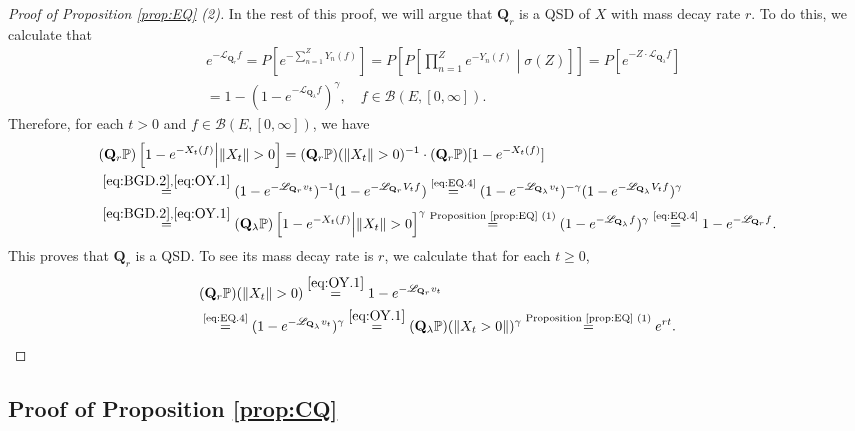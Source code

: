 \documentclass[12pt,a4paper]{amsart}
\numberwithin{equation}{section}
\theoremstyle{plain}
\theoremstyle{definition}
\theoremstyle{remark}
\begin{document}
\begin{proof}[Proof of Proposition \ref{prop:EQ} (2)]
	In the rest of this proof, we will argue that $\mathbf Q_r$ is a QSD of $X$ with mass decay rate $r$.
	To do this, we calculate that
\begin{align}
	&e^{- \mathscr L_{\mathbf Q_r} f}
	= P[ e^{-\sum_{n=1}^Z Y_n(f)} ] 	
	= P\left[P\left[ \prod_{n=1}^Z e^{-Y_n(f)} \middle | \sigma(Z)\right]\right]
	= P \left[ e^{-Z \cdot \mathscr L_{\mathbf Q_\lambda } f}\right]
	\\&= 1 - (1 - e^{- \mathscr L_{\mathbf Q_\lambda} f})^\gamma, \quad f\in \mathcal B(E,[0,\infty]).  \label{eq:EQ.4}
\end{align}
	Therefore, for each $t> 0$ and $f\in \mathcal B(E,[0,\infty])$, we have
\begin{align}
	&(\mathbf Q_r \mathbb P)\left[ 1 - e^{-X_t (f)} \middle|\|X_t\|>0 \right]
	= (\mathbf Q_r \mathbb P)(\|X_t\| >0)^{-1} \cdot (\mathbf Q_r \mathbb P) [1 - e^{- X_t(f)}]
	\\&\overset{\eqref{eq:BGD.2}, \eqref{eq:OY.1}}= (1 - e^{- \mathscr L_{\mathbf Q_r} v_t})^{-1}  (1 - e^{- \mathscr L_{\mathbf Q_r} V_tf})
	\overset{\text{\eqref{eq:EQ.4}}}= (1 - e^{- \mathscr L_{\mathbf Q_\lambda} v_t})^{-\gamma}(1 - e^{- \mathscr L_{\mathbf Q_\lambda} V_tf})^{\gamma}
	\\&\overset{\eqref{eq:BGD.2}, \eqref{eq:OY.1}}= (\mathbf Q_\lambda \mathbb P)\left[1 - e^{- X_t(f)}\middle| \|X_t\|>0\right]^{\gamma}
	\overset{\text{Proposition \ref{prop:EQ} (1)}}= (1 - e^{- \mathscr L_{\mathbf Q_\lambda} f})^{\gamma}
	\overset{\text{\eqref{eq:EQ.4}}}= 1 - e^{- \mathscr L_{\mathbf Q_r} f}.
\end{align}
	This proves that $\mathbf Q_r$ is a QSD.
	To see its mass decay rate is $r$, we calculate that for each $t\geq 0$,
\begin{align}
	&(\mathbf Q_r \mathbb P)(\|X_t\|>0)
	\overset{\eqref{eq:OY.1}}= 1 - e^{- \mathscr L_{\mathbf Q_r} v_t}
	\\& \overset{\text{\eqref{eq:EQ.4}}}= (1 - e^{- \mathscr L_{\mathbf Q_\lambda} v_t})^\gamma
	\overset{\eqref{eq:OY.1}}= (\mathbf Q_\lambda \mathbb P) (\|X_t > 0\|)^\gamma \overset{\text{Proposition \ref{prop:EQ} (1)}}= e^{ r t}. \qedhere
\end{align}
\end{proof}

\subsection{Proof of Proposition \ref{prop:CQ}} \label{sec:CQ}
\end{document}
